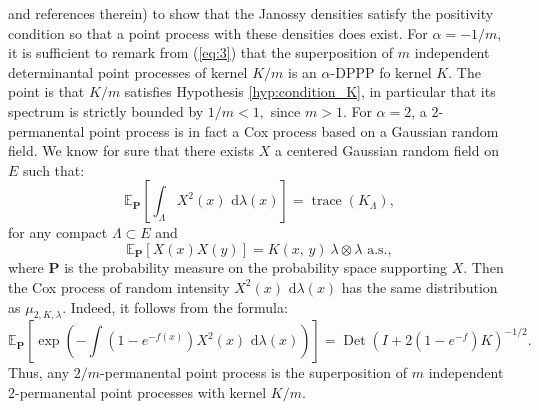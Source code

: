 \documentclass[11pt,a4paper]{amsart}
\begin{document}
\cite{MR2018415,math.PR/0002099} and references therein) to show that
the Janossy densities satisfy the positivity condition so that a point
process with these densities does exist. For $\alpha=-1/m$, it is
sufficient to remark from (\ref{eq:3}) that the superposition of $m$
independent determinantal point processes of kernel $K/m$ is an
$\alpha$-DPPP fo kernel $K$. The point is that $K/m$ satisfies Hypothesis
\ref{hyp:condition_K}, in particular that its spectrum is strictly
bounded by $1/m< 1,$ since $m> 1$.  For $\alpha=2$, a
$2$-permanental point process is in fact a Cox process based on a
Gaussian random field. We know for sure that there exists $X$ a
centered Gaussian random field on $E$ such that:
\begin{equation}
  \label{eq:5b}
  {{\mathbb E}_{{{\mathbf P}}}\left[{{\int_\Lambda X^2(x){\text{ d}} \lambda(x)}}\right]}={\operatorname{trace}}(K_\Lambda),
\end{equation}
for any compact $\Lambda\subset E$ and
\begin{equation}
  \label{eq:6}  {{\mathbb E}_{{{\mathbf P}}}\left[{{X(x)X(y)}}\right]}=K(x,\, y) \ \lambda\otimes \lambda
  \text{ a.s.}, 
\end{equation}
where ${{\mathbf P}}$ is the probability measure on the probability space
supporting $X$.  Then the Cox process of random intensity $X^2(x){\text{ d}}
\lambda(x)$ has the same distribution as $\mu_{2,K,\lambda}.$ Indeed,
it follows from the formula:
\begin{equation*}
  {{\mathbb E}_{{{\mathbf P}}}\left[{{\exp\left(-\int (1-e^{-f(x)}) X^2(x){\text{ d}} \lambda(x)\right)}}\right]}={\operatorname{Det}}(I+2(1-e^{-f})K)^{-1/2}.
\end{equation*}
Thus, any $2/m$-permanental point process is the superposition of $m$
independent $2$-permanental point processes with kernel $K/m$.
\end{document}
